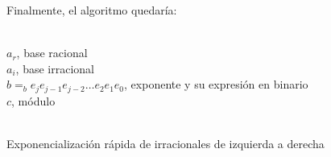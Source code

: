 \begin{enumerate}
		Finalmente, el algoritmo quedaría:
		\begin{algorithm}[H]
			\begin{algorithmic}[1]
				\REQUIRE \ \\
					\texttt{$a_r$}, base racional\\
					\texttt{$a_i$}, base irracional\\
					\texttt{$b =_b e_je_{j-1}e_{j-2}\dots e_2e_1e_0$}, exponente y su expresión en binario \\
					\texttt{$c$}, módulo\\ \
						\STATE{\texttt{$exp = exp + 1$}}
					\ENDIF
				\ENDWHILE
			\end{algorithmic}
			\caption{Exponencialización rápida de irracionales de izquierda a derecha}
			\label{Fast-exp-irr}
		\end{algorithm}
		

\end{enumerate}
